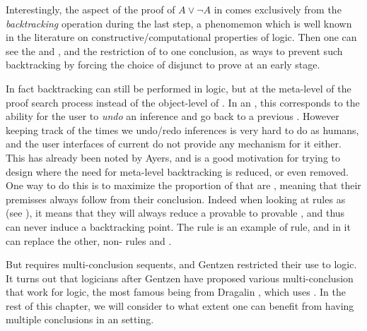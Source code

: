 \begin{scope}
Interestingly, the  aspect of the proof of $A \lor \neg A$ in
 comes exclusively from the \emph{backtracking} operation during
the last step, a phenomemon which is well known in the literature on
constructive/computational properties of  logic.
Then one can see the  {} and {},
and the restriction of   to one conclusion, as ways to
prevent such backtracking by forcing the choice of disjunct to prove at an early
stage.

In fact backtracking can still be performed in  logic, but at the
meta-level of the proof search process instead of the object-level of . In an , this corresponds to the ability for the
user to \emph{undo} an inference and go back to a previous . However
keeping track of the times we undo/redo inferences is very hard to do as humans,
and the user interfaces of current  do not provide any mechanism
for it either. This has already been noted by Ayers, and is a good motivation for trying to design
 where the need for meta-level backtracking is reduced, or even
removed. One way to do this is to maximize the proportion of 
that are \emph{}, meaning that their premisses always follow from
their conclusion. Indeed when looking at rules as  (see ),
it means that they will always reduce a provable  to provable , and
thus can never induce a backtracking point. The {} rule is an example of
 rule, and in  it can replace the other, non- rules
{} and {}.

But {} requires multi-conclusion sequents, and Gentzen restricted
their use to  logic. It turns out that logicians after Gentzen have
proposed various multi-conclusion  that work for 
logic, the most famous being  from Dragalin
, which uses {}. In the rest of
this chapter, we will consider to what extent one can benefit from having
multiple conclusions in an  setting.


\end{scope}
